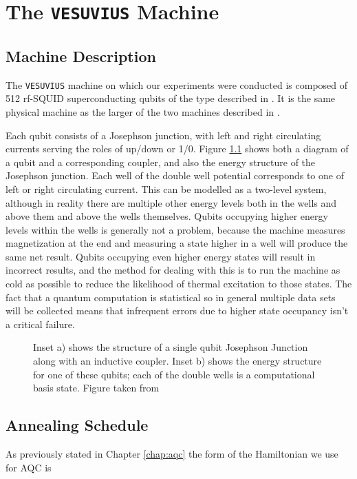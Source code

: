 \chapter{The \texttt{VESUVIUS} Machine}
\label{chap:machine}
\section{Machine Description}
The \texttt{VESUVIUS} machine on which our experiments were conducted is composed of 512 rf-SQUID superconducting qubits of the type described in \cite{qubit} \cite{dwave_nature}. It is the same physical machine as the larger of the two machines described in \cite{pudenz}.

Each qubit consists of a Josephson junction, with left and right circulating currents serving the roles of up/down or 1/0.  Figure \ref{fig:josephson} shows both a diagram of a qubit and a corresponding coupler, and also the energy structure of the Josephson junction.  Each well of the double well potential corresponds to one of left or right circulating current.  This can be modelled as a two-level system, although in reality there are multiple other energy levels both in the wells and above them and above the wells themselves.  Qubits occupying higher energy levels within the wells is generally not a problem, because the machine measures magnetization at the end and measuring a state higher in a well will produce the same net result.\cite{qubit}
Qubits occupying even higher energy states will result in incorrect results, and the method for dealing with this is to run the machine as cold as possible to reduce the likelihood of thermal excitation to those states. The fact that a quantum computation is statistical so in general multiple data sets will be collected means that infrequent errors due to higher state occupancy isn't a critical failure.

\begin{figure}
	\caption[Josephson Junction and Energy Diagram]{Inset a) shows the structure of a single qubit Josephson Junction along with an inductive coupler.  Inset b) shows the energy structure for one of these qubits; each of the double wells is a computational basis state.  Figure taken from \cite{qubit}}
	\label{fig:josephson}
\end{figure}

\section{Annealing Schedule}
As previously stated in Chapter \ref{chap:aqc} the form of the Hamiltonian we use for AQC is

